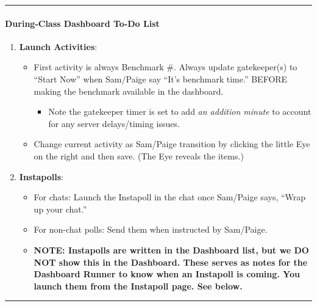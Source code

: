 \documentclass[
]{article}
\providecommand{\tightlist}{%
  \setlength{\itemsep}{0pt}\setlength{\parskip}{0pt}}
\begin{document}
\begin{center}\rule{0.5\linewidth}{0.5pt}\end{center}

\hypertarget{during-class-dashboard-to-do-list}{%
\paragraph{During-Class Dashboard To-Do List}\label{during-class-dashboard-to-do-list}}

\begin{enumerate}
\def\labelenumi{\arabic{enumi}.}
\tightlist
\item
  \textbf{Launch Activities}:

  \begin{itemize}
  \tightlist
  \item
    First activity is always Benchmark \#. Always update gatekeeper(s) to ``Start Now'' when Sam/Paige say ``It's benchmark time.'' BEFORE making the benchmark available in the dashboard.

    \begin{itemize}
    \tightlist
    \item
      Note the gatekeeper timer is set to add \emph{an addition minute} to account for any server delays/timing issues.
    \end{itemize}
  \item
    Change current activity as Sam/Paige transition by clicking the little Eye on the right and then save. (The Eye reveals the items.)
  \end{itemize}
\item
  \textbf{Instapolls}:

  \begin{itemize}
  \tightlist
  \item
    For chats: Launch the Instapoll in the chat once Sam/Paige says, ``Wrap up your chat.''\\
  \item
    For non-chat polls: Send them when instructed by Sam/Paige.\\
  \item
    \textbf{NOTE: Instapolls are written in the Dashboard list, but we DO NOT show this in the Dashboard. These serves as notes for the Dashboard Runner to know when an Instapoll is coming. You launch them from the Instapoll page. See below.}
  \end{itemize}
\end{enumerate}

\begin{center}\rule{0.5\linewidth}{0.5pt}\end{center}
\end{document}
